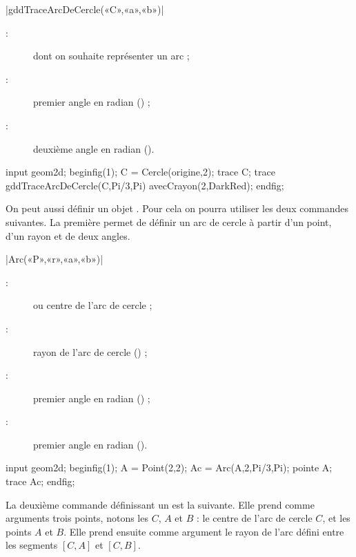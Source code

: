 \documentclass[a4paper,french]{article}
\begin{document}
\begin{colourband}
\macro|gddTraceArcDeCercle(«C»,«a»,«b»)|
\begin{description}
  \item[:]  dont on souhaite représenter un arc ;
  \item[:] premier angle en radian () ;
  \item[:] deuxième angle en radian ().
\end{description}
\end{colourband}

\begin{ExempleMP}
input geom2d;
beginfig(1);
C = Cercle(origine,2);
trace C;
trace gddTraceArcDeCercle(C,Pi/3,Pi) avecCrayon(2,DarkRed);
endfig;
\end{ExempleMP}

On peut aussi définir un objet . Pour cela on pourra utiliser
les deux commandes suivantes. La première permet de définir un arc de cercle à
partir d'un point, d'un rayon et de deux angles.

\begin{colourband}
\macro|Arc(«P»,«r»,«a»,«b»)|
\begin{description}
  \item[:]  ou  centre de l'arc de cercle ;
  \item[:] rayon de l'arc de cercle () ;
  \item[:] premier angle en radian () ;
  \item[:] premier angle en radian ().
\end{description}
\end{colourband}


\begin{ExempleMP}
input geom2d;
beginfig(1);
A = Point(2,2);
Ac = Arc(A,2,Pi/3,Pi);
pointe A;
trace Ac;
endfig;
\end{ExempleMP}

La deuxième commande définissant un  est la suivante. Elle prend
comme arguments trois points, notons les $C$, $A$ et $B$ : le centre de l'arc de
cercle $C$, et les points $A$ et $B$. Elle prend ensuite comme argument le rayon
de l'arc défini entre les segments $[C,A]$ et $[C,B]$.
\end{document}
